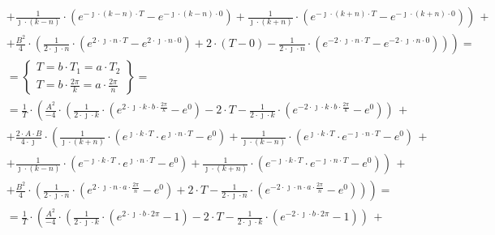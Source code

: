 \begin{task}
\begin{align*}
&+ \left.\left.  \frac{1}{\jmath \cdot \left(k-n\right)} \cdot \left( e^{-\jmath \cdot \left(k-n\right) \cdot T} - e^{-\jmath \cdot \left(k-n\right) \cdot 0}\right) + \frac{1}{ \jmath \cdot \left(k+n\right) } \cdot \left( e^{-\jmath \cdot \left(k+n\right) \cdot T} - e^{-\jmath \cdot \left(k+n\right) \cdot 0} \right) \right)\,+\right.\\
&+ \left. \frac{B^2}{4} \cdot \left( \frac{1}{2\cdot \jmath \cdot n} \cdot \left( e^{2\cdot \jmath \cdot n \cdot T} - e^{2\cdot \jmath \cdot n \cdot 0}\right)+2\cdot \left( T-0\right) - \frac{1}{2\cdot \jmath \cdot n}\cdot \left( e^{-2\cdot \jmath \cdot n \cdot T} - e^{-2\cdot \jmath \cdot n \cdot 0} \right) \right) \right)=\\
&=\left\{\begin{array}{l}
T=b \cdot T_{1}= a \cdot T_{2}\\
T=b \cdot \frac{2\pi}{k} = a \cdot \frac{2\pi}{n}
\end{array}\right\}=\\
&=\frac{1}{T} \cdot \left( \frac{A^2}{-4}\cdot \left( \frac{1}{2\cdot \jmath \cdot k} \cdot \left( e^{2\cdot \jmath \cdot k \cdot b \cdot \frac{2\pi}{k}} -  e^{0} \right) -2 \cdot T - \frac{1}{2\cdot \jmath \cdot k}\cdot \left(e^{-2\cdot \jmath \cdot k \cdot b \cdot \frac{2\pi}{k}} - e^{0} \right) \right) \,+\right. \\
&+ \left. \frac{2 \cdot A\cdot B}{4 \cdot \jmath} \cdot \left( \frac{1}{\jmath \cdot \left(k+n\right)} \cdot \left( e^{\jmath \cdot k \cdot T}\cdot e^{\jmath \cdot n \cdot T}-e^{0}\right) + \frac{1}{\jmath \cdot \left(k-n\right) } \cdot \left( e^{\jmath \cdot k \cdot T} \cdot e^{-\jmath \cdot n \cdot T}- e^{0}\right) \,+\right.\right.\\
&+ \left.\left.  \frac{1}{\jmath \cdot \left(k-n\right)} \cdot \left( e^{-\jmath \cdot k \cdot T} \cdot e^{\jmath \cdot n \cdot T}- e^{0}\right) + \frac{1}{\jmath \cdot \left(k+n\right) } \cdot \left( e^{-\jmath \cdot k \cdot T} \cdot e^{-\jmath \cdot n \cdot T}- e^{0} \right) \right)\,+\right.\\
&+ \left. \frac{B^2}{4} \cdot \left( \frac{1}{2\cdot \jmath \cdot n} \cdot \left( e^{2\cdot \jmath \cdot n \cdot a \cdot \frac{2\pi}{n}} - e^{0}\right)+2\cdot T - \frac{1}{2\cdot \jmath \cdot n}\cdot \left( e^{-2\cdot \jmath \cdot n \cdot a \cdot \frac{2\pi}{n}} - e^{0} \right) \right) \right)=\\
&=\frac{1}{T} \cdot \left( \frac{A^2}{-4}\cdot \left( \frac{1}{2\cdot \jmath \cdot k} \cdot \left( e^{2\cdot \jmath \cdot b \cdot 2\pi} -  1 \right) -2 \cdot T - \frac{1}{2\cdot \jmath \cdot k}\cdot \left(e^{-2\cdot \jmath \cdot b \cdot 2\pi} - 1 \right) \right) \,+\right. \\

\end{align*}
\end{task}
